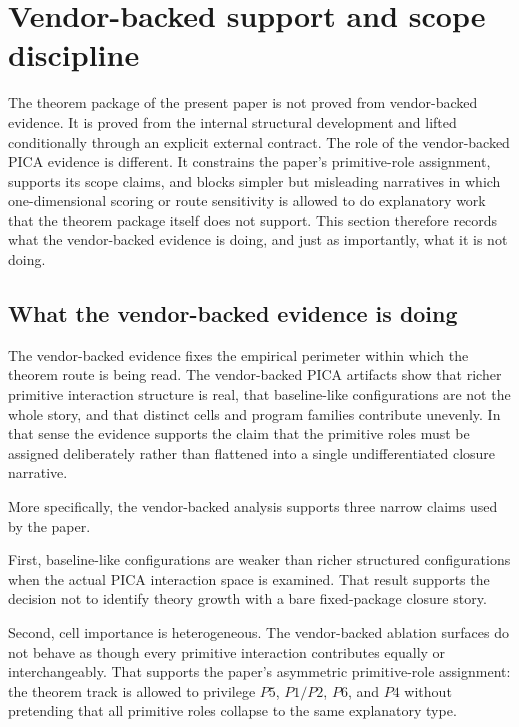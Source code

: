 \section{Vendor-backed support and scope discipline}\label{sec:vendor-support}

The theorem package of the present paper is not proved from vendor-backed
evidence. It is proved from the internal structural development and lifted
conditionally through an explicit external contract. The role of the
vendor-backed PICA evidence is different. It constrains the paper's
primitive-role assignment, supports its scope claims, and blocks simpler but
misleading narratives in which one-dimensional scoring or route sensitivity is
allowed to do explanatory work that the theorem package itself does not
support. This section therefore records what the vendor-backed evidence is
doing, and just as importantly, what it is not doing.

\subsection*{What the vendor-backed evidence is doing}

The vendor-backed evidence fixes the empirical perimeter within which the
theorem route is being read. The vendor-backed PICA artifacts show that richer
primitive interaction structure is real, that baseline-like configurations are
not the whole story, and that distinct cells and program families contribute
unevenly. In that sense the evidence supports the claim that the primitive roles
must be assigned deliberately rather than flattened into a single
undifferentiated closure narrative.

More specifically, the vendor-backed analysis supports three narrow claims used
by the paper.

First, baseline-like configurations are weaker than richer structured
configurations when the actual PICA interaction space is examined. That result
supports the decision not to identify theory growth with a bare fixed-package
closure story.

Second, cell importance is heterogeneous. The vendor-backed ablation surfaces do
not behave as though every primitive interaction contributes equally or
interchangeably. That supports the paper's asymmetric primitive-role assignment:
the theorem track is allowed to privilege \(P5\), \(P1/P2\), \(P6\), and \(P4\) without
pretending that all primitive roles collapse to the same explanatory type.

